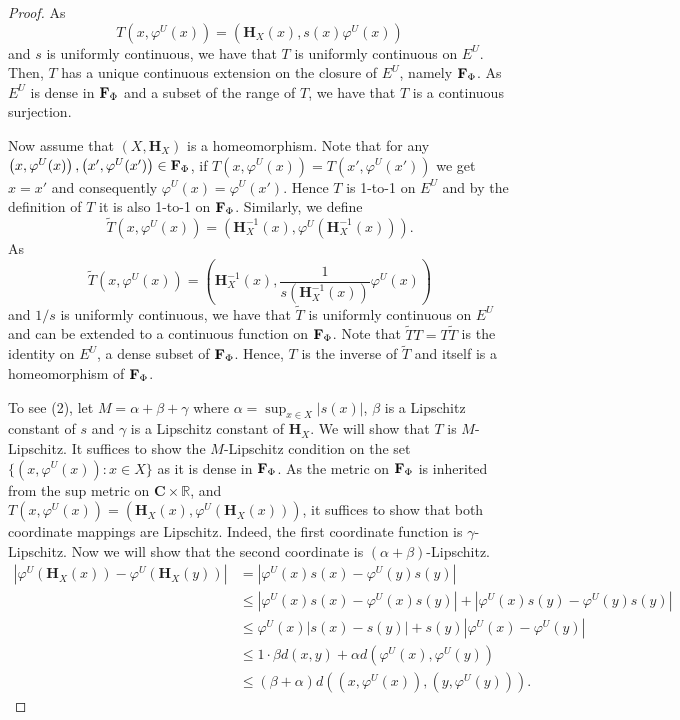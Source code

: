\documentclass[11pt]{amsart}
\newcommand{\R}{\mathbb{R}}  %
\newcommand{\cantor}{\mathbf C}
\newcommand{\fence}{{\bf F}_{\Phi}{}}
\newcommand{\homeocantor}{{\mathbf H}_{X}}
\begin{document}
{\begin{proof}
As 
\[T\left(x, \varphi^U(x)\right)=\left(\homeocantor(x), s(x)\varphi^U(x) \right )\] and $s$ is uniformly continuous, we have that $T$ is uniformly continuous on $E^U$. Then, $T$ has a unique continuous extension on the closure of $E^U$, namely ${\bf F}_{\Phi}$. As $E^U$ is dense in ${\bf F}_{\Phi}$ and a subset of the range of $T$, we have that $T$ is a continuous surjection.  

 Now assume that $(X,\homeocantor)$ is a homeomorphism. Note that for any\\
 $\left(x, \varphi^U(x)\right), \left(x', \varphi^U(x')\right)\in {\bf F}_{\Phi}$, if $T\left(x, \varphi^U(x)\right)=T\left(x', \varphi^U(x')\right)$ we get $x=x'$ and consequently $\varphi^U(x)=\varphi^U(x')$. 
Hence $T$ is 1-to-1 on $E^U$ and by the definition of $T$ it is also 1-to-1 on ${\bf F}_{\Phi}$. Similarly, we define
\[\tilde{T}\left(x, \varphi^U(x)\right)=\left(\homeocantor^{-1}(x), \varphi^U(\homeocantor^{-1}(x))\right).\]
As 
\begin{equation}\label{eq:tildeT}
\tilde{T}(x, \varphi^U(x))=\left (\homeocantor^{-1}(x), \frac{1}{s(\homeocantor^{-1}(x))}\varphi^U(x) \right )
\end{equation}
and $1/s$ is uniformly continuous, we have that $\tilde{T}$ is uniformly continuous on $E^U$ and can be extended to a continuous function on ${\bf F}_{\Phi}$. Note that $\tilde{T}T=T\tilde{T}$ is the identity on $E^U$, a dense subset of ${\bf F}_{\Phi}$. Hence, $T$ is the inverse of $\tilde{T}$ and itself is a homeomorphism of $\fence$.


To see (2), let  $M =\alpha + \beta + \gamma $ where $\alpha= \sup_{x \in X} |s(x)|$, $\beta$ is a Lipschitz constant of  $s$ and $\gamma$ is a Lipschitz constant of $\homeocantor$. We will show that $T$ is $M$-Lipschitz. It  suffices to show the $M$-Lipschitz condition on the set $\{(x, \varphi^U(x)):x \in X\}$ as it is dense in ${\bf F}_{\Phi}$. As the metric on ${\bf F}_{\Phi}$ is inherited from the sup metric on $\cantor \times \R$, and $T\left(x, \varphi^U(x)\right)=\left(\homeocantor(x), \varphi^U(\homeocantor(x))\right)$, it suffices to show that both coordinate mappings are Lipschitz. Indeed, the first coordinate function is $\gamma$-Lipschitz. Now we will show that the second coordinate is $(\alpha + \beta)$-Lipschitz.
\begin{align*}
    \left | \varphi^U(\homeocantor(x)) -\varphi^U(\homeocantor(y)) \right | &=  \left | \varphi^U(x) s(x)  -\varphi^U(y) s(y) \right |\\
    & \leq \left | \varphi^U(x) s(x)  -\varphi^U(x) s(y) \right | + \left | \varphi^U(x) s(y)  -\varphi^U(y) s(y) \right | \\
    & \leq  \varphi^U(x) \left |  s(x)  - s(y) \right | + s(y)\left | \varphi^U(x)   -\varphi^U(y)  \right | \\
    & \leq 1 \cdot \beta d(x,y) + \alpha d(\varphi^U(x),\varphi^U(y) )\\
    &  \le ( \beta + \alpha ) d((x,\varphi^U(x)), (y,\varphi^U(y))).
\end{align*}


\end{proof}}
\end{document}
